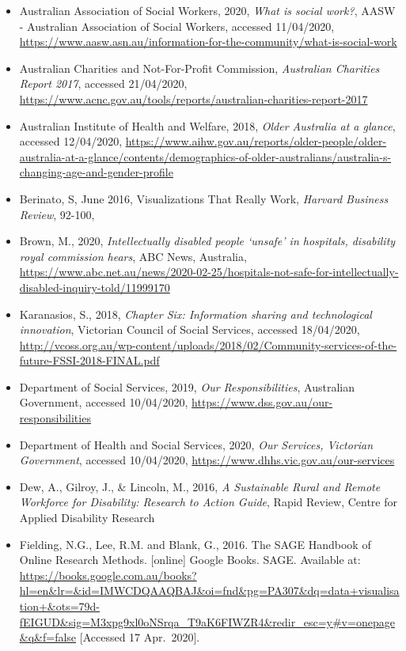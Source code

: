 \documentclass[
  11pt,
]{article}
\begin{document}
\begin{itemize}
\item
  Australian Association of Social Workers, 2020, \emph{What is social work?}, AASW - Australian Association of Social Workers, accessed 11/04/2020, \url{https://www.aasw.asn.au/information-for-the-community/what-is-social-work}
\item
  Australian Charities and Not-For-Profit Commission, \emph{Australian Charities Report 2017}, accessed 21/04/2020, \url{https://www.acnc.gov.au/tools/reports/australian-charities-report-2017}
\item
  Australian Institute of Health and Welfare, 2018, \emph{Older Australia at a glance}, accessed 12/04/2020, \url{https://www.aihw.gov.au/reports/older-people/older-australia-at-a-glance/contents/demographics-of-older-australians/australia-s-changing-age-and-gender-profile}
\item
  Berinato, S, June 2016, Visualizations That Really Work, \emph{Harvard Business Review}, 92-100,
\item
  Brown, M., 2020, \emph{Intellectually disabled people `unsafe' in hospitals, disability royal commission hears}, ABC News, Australia, \url{https://www.abc.net.au/news/2020-02-25/hospitals-not-safe-for-intellectually-disabled-inquiry-told/11999170}
\item
  Karanasios, S., 2018, \emph{Chapter Six: Information sharing and technological innovation}, Victorian Council of Social Services, accessed 18/04/2020, \url{http://vcoss.org.au/wp-content/uploads/2018/02/Community-services-of-the-future-FSSI-2018-FINAL.pdf}
\item
  Department of Social Services, 2019, \emph{Our Responsibilities}, Australian Government, accessed 10/04/2020, \url{https://www.dss.gov.au/our-responsibilities}
\item
  Department of Health and Social Services, 2020, \emph{Our Services, Victorian Government}, accessed 10/04/2020, \url{https://www.dhhs.vic.gov.au/our-services}
\item
  Dew, A., Gilroy, J., \& Lincoln, M., 2016, \emph{A Sustainable Rural and Remote Workforce for Disability: Research to Action Guide}, Rapid Review, Centre for Applied Disability Research
\item
  Fielding, N.G., Lee, R.M. and Blank, G., 2016. The SAGE Handbook of Online Research Methods. {[}online{]} Google Books. SAGE. Available at: \url{https://books.google.com.au/books?hl=en\&lr=\&id=IMWCDQAAQBAJ\&oi=fnd\&pg=PA307\&dq=data+visualisation+\&ots=79d-fEIGUD\&sig=M3xpg9xl0oNSrqa_T9aK6FIWZR4\&redir_esc=y\#v=onepage\&q\&f=false} {[}Accessed 17 Apr.~2020{]}.

\end{itemize}
\end{document}
